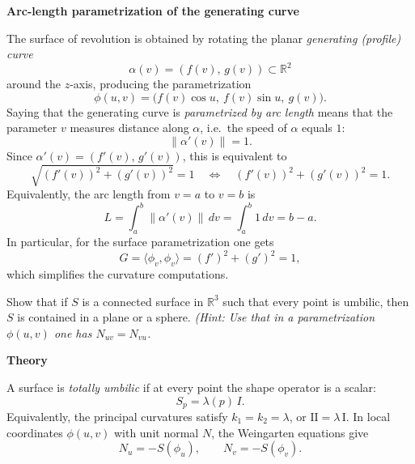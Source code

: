\begin{solution}
	
	\par\medskip\noindent\textbf{Arc-length parametrization of the generating curve}\par\smallskip

	The surface of revolution is obtained by rotating the planar \emph{generating (profile) curve}
	\[
	\alpha(v)=(f(v),\,g(v))\subset \mathbb{R}^2
	\]
	around the $z$-axis, producing the parametrization
	\[
	\phi(u,v)=\bigl(f(v)\cos u,\ f(v)\sin u,\ g(v)\bigr).
	\]
	Saying that the generating curve is \emph{parametrized by arc length} means that the parameter $v$
	measures distance along $\alpha$, i.e.\ the speed of $\alpha$ equals $1$:
	\[
	\|\alpha'(v)\|=1.
	\]
	Since $\alpha'(v)=(f'(v),\,g'(v))$, this is equivalent to
	\[
	\sqrt{(f'(v))^2+(g'(v))^2}=1
	\quad\Longleftrightarrow\quad
	(f'(v))^2+(g'(v))^2=1.
	\]
	Equivalently, the arc length from $v=a$ to $v=b$ is
	\[
	L=\int_a^b \|\alpha'(v)\|\,dv=\int_a^b 1\,dv=b-a.
	\]
	In particular, for the surface parametrization one gets
	\[
	G=\langle \phi_v,\phi_v\rangle=(f')^2+(g')^2=1,
	\]
	which simplifies the curvature computations.

\end{solution}

\begin{problem}
\label{prob:cp-vii-0052}
Show that if $S$ is a connected surface in $\mathbb R^3$ such that every point is umbilic, then
	$S$ is contained in a plane or a sphere.
	\emph{(Hint: Use that in a parametrization $\phi(u,v)$ one has $N_{uv}=N_{vu}$.}
	
	\par\medskip\noindent\textbf{Theory}\par\smallskip

	A surface is \emph{totally umbilic} if at every point the shape operator is a scalar:
	\[
	S_p=\lambda(p)\,I.
	\]
	Equivalently, the principal curvatures satisfy $k_1=k_2=\lambda$, or $\mathrm{II}=\lambda\,\mathrm{I}$.
	In local coordinates $\phi(u,v)$ with unit normal $N$, the Weingarten equations give
	\[
	N_u=-S(\phi_u),\qquad N_v=-S(\phi_v).
	\]
\end{problem}

